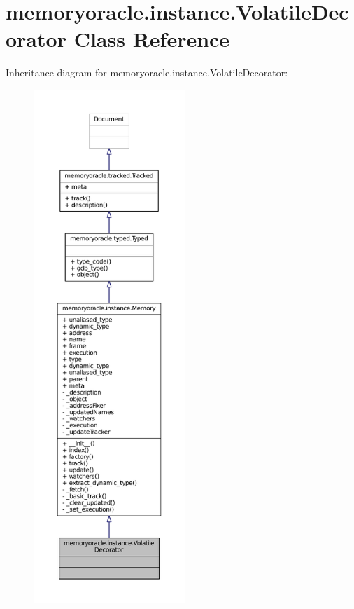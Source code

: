 \hypertarget{classmemoryoracle_1_1instance_1_1VolatileDecorator}{}\section{memoryoracle.\+instance.\+Volatile\+Decorator Class Reference}
\label{classmemoryoracle_1_1instance_1_1VolatileDecorator}


Inheritance diagram for memoryoracle.\+instance.\+Volatile\+Decorator\+:
\nopagebreak
\begin{figure}[H]
\begin{center}
\leavevmode
\includegraphics[height=550pt]{classmemoryoracle_1_1instance_1_1VolatileDecorator__inherit__graph}
\end{center}
\end{figure}


